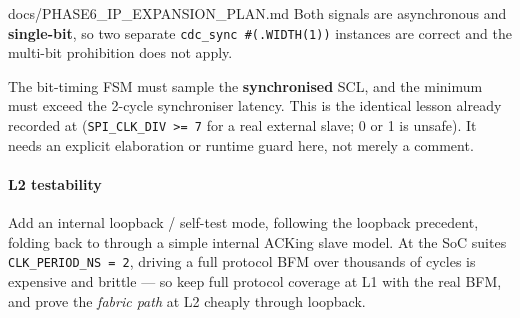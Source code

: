 \begin{relocated}{docs/PHASE6_IP_EXPANSION_PLAN.md}
Both  signals are asynchronous and \textbf{single-bit}, so two
separate \texttt{cdc\_\allowbreak{}sync\ \#(.\allowbreak{}WIDTH(1))}
instances are correct and the multi-bit prohibition does not apply.

\warn{} The bit-timing FSM must sample the \textbf{synchronised} SCL,
and the minimum  must exceed the 2-cycle synchroniser
latency. This is the identical lesson already recorded at
(\texttt{SPI\_\allowbreak{}CLK\_\allowbreak{}DIV\ >=\allowbreak{}\ 7}
for a real external slave; 0 or 1 is unsafe). It needs an explicit
elaboration or runtime guard here, not merely a comment.

\paragraph{L2 testability}\label{ds:ch:phase6-ip-expansion-plan:l2-testability}

Add an internal loopback / self-test mode, following the
 loopback precedent, folding  back to
 through a simple internal ACKing slave model. At the SoC
suites\textquotesingle{}
\texttt{CLK\_\allowbreak{}PERIOD\_\allowbreak{}NS\ =\allowbreak{}\ 2},
driving a full protocol BFM over thousands of cycles is expensive and
brittle --- so keep full protocol coverage at L1 with the real BFM, and
prove the \emph{fabric path} at L2 cheaply through loopback.


\end{relocated}

